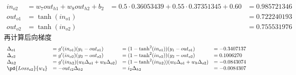 \documentclass[a4paper, 11pt]{article}
\begin{document}
\begin{answer}
\begin{itemize}
\[\begin{array}{llll}
        in_{o2} &= w_7 out_{h1} + w_8 out_{h2} +b_2 &= 0.5\cdot 0.36053439 + 0.55\cdot 0.37351345 + 0.60 &= 0.985721346\\
        out_{o1} &= \tanh(in_{o1}) & &= 0.722240193\\
        out_{o2} &= \tanh(in_{o2}) & &= 0.755531976
    \end{array}\]
    再计算后向梯度
    \[\begin{array}{llll}
        \Delta_{o1}&=g'(in_{o1})(y_1-out_{o1})&=(1-\tanh^2(in_{o1}))(y_1-out_{o1})&=-0.3407137\\
        \Delta_{o2}&=g'(in_{o2})(y_2-out_{o2})&=(1-\tanh^2(in_{o2}))(y_2-out_{o2})&=0.1006270\\
        \Delta_{h2}&=g'(in_{h2})(w_6\Delta_{o1}+w_8\Delta_{o2})&=(1-\tanh^2(in_{h2}))(w_6\Delta_{o1}+w_8\Delta_{o2})&=-0.0843074\\
        \pd{Loss_{o2}}{w_4}&=-out_{i2}\Delta_{h2}&=i_2\Delta_{h2}&=-0.0084307
    \end{array}\]
\end{itemize}
\end{answer}
\end{document}
